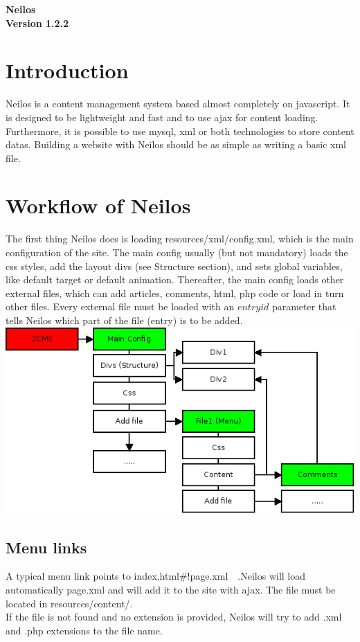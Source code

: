 \documentclass[a4paper,12pt]{article}
\begin{document}
\begin{center}
 \huge \bfseries {Neilos}\\
 \normalfont \normalsize Version 1.2.2
\\[0.5cm]
\end{center}
\tableofcontents
\newpage
\section{Introduction}
Neilos is a content management system based almost completely on javascript. It is designed to be lightweight and fast and to use ajax for content loading. Furthermore, it is possible to use mysql, xml or both technologies to store content datas. Building a website with Neilos should be as simple as writing a basic xml file.
\section{Workflow of Neilos}
The first thing Neilos does is loading resources/xml/config.xml, which is the main configuration of the site. The main config usually (but not mandatory) loads the css styles, add the layout divs (see Structure section), and sets global variables, like default target or default animation. Thereafter, the main config loads other external files, which can add articles, comments, html, php code or load in turn other files. Every external file must be loaded with an $entryid$ parameter that tells Neilos which part of the file (entry) is to be added. \\
\includegraphics[scale=0.7]{Diagramma_neilos.png} 
\subsection{Menu links}
A typical menu link points to index.html\#!page.xml\ \ .Neilos will load automatically page.xml and will add it to the site with ajax. The file must be located in resources/content/.\\
If the file is not found and no extension is provided, Neilos will try to add .xml and .php extensions to the file name.
\end{document}

